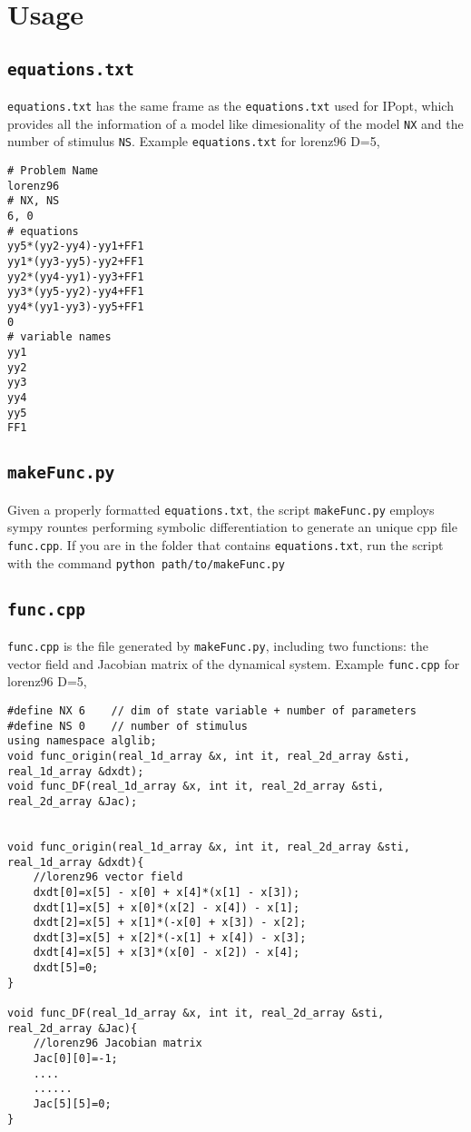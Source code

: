 \documentclass[11pt]{article}
\begin{document}
\section{Usage}
\subsection{\texttt{equations.txt}}
\texttt{equations.txt} has the same frame as the \texttt{equations.txt} used for IPopt, which provides all the information of a model like dimesionality of the model \texttt{NX} and the number of stimulus \texttt{NS}. Example \texttt{equations.txt} for lorenz96 D=5,
\begin{verbatim}
# Problem Name
lorenz96
# NX, NS
6, 0
# equations
yy5*(yy2-yy4)-yy1+FF1
yy1*(yy3-yy5)-yy2+FF1
yy2*(yy4-yy1)-yy3+FF1
yy3*(yy5-yy2)-yy4+FF1
yy4*(yy1-yy3)-yy5+FF1
0
# variable names
yy1
yy2
yy3
yy4
yy5
FF1
\end{verbatim}
\subsection{\texttt{makeFunc.py}}
Given a properly formatted \texttt{equations.txt}, the script \texttt{makeFunc.py} employs sympy rountes performing symbolic differentiation to generate an unique cpp file \texttt{func.cpp}. If you are in the folder that contains \texttt{equations.txt}, run the script with the command \texttt{python path/to/makeFunc.py}
\subsection{\texttt{func.cpp}}
\texttt{func.cpp} is the file generated by \texttt{makeFunc.py}, including two functions: the vector field and Jacobian matrix of the dynamical system. Example \texttt{func.cpp} for lorenz96 D=5,
\begin{verbatim}
#define NX 6	// dim of state variable + number of parameters
#define NS 0	// number of stimulus
using namespace alglib;
void func_origin(real_1d_array &x, int it, real_2d_array &sti, real_1d_array &dxdt);
void func_DF(real_1d_array &x, int it, real_2d_array &sti, real_2d_array &Jac);


void func_origin(real_1d_array &x, int it, real_2d_array &sti, real_1d_array &dxdt){
	//lorenz96 vector field
	dxdt[0]=x[5] - x[0] + x[4]*(x[1] - x[3]);
	dxdt[1]=x[5] + x[0]*(x[2] - x[4]) - x[1];
	dxdt[2]=x[5] + x[1]*(-x[0] + x[3]) - x[2];
	dxdt[3]=x[5] + x[2]*(-x[1] + x[4]) - x[3];
	dxdt[4]=x[5] + x[3]*(x[0] - x[2]) - x[4];
	dxdt[5]=0;
}

void func_DF(real_1d_array &x, int it, real_2d_array &sti, real_2d_array &Jac){
	//lorenz96 Jacobian matrix
	Jac[0][0]=-1;
 	....
 	......
	Jac[5][5]=0;
}
\end{verbatim}
\end{document}
